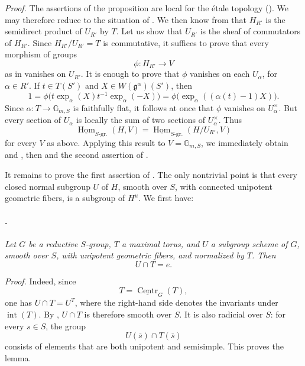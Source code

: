 \textit{Proof.}
The assertions of the proposition are local for the étale topology
\textup{()}. We may therefore reduce to the situation
of . We then know from  that \(H_{R'}\) is the semidirect
product of \(U_{R'}\) by \(T\). Let us show that \(U_{R'}\) is the
sheaf of commutators of \(H_{R'}\). Since
\(H_{R'}/U_{R'}=T\) is commutative, it suffices to prove that every
morphism of groups
\[
  \phi:H_{R'}\longrightarrow V
\]
as in \textup{} vanishes on \(U_{R'}\). It is enough to prove
that \(\phi\) vanishes on each \(U_\alpha\), for \(\alpha\in R'\).
If \(t\in T(S')\) and \(X\in W(\mathfrak g^\alpha)(S')\), then
\[
  1
  =
  \phi\bigl(t\exp_\alpha(X)t^{-1}\exp_\alpha(-X)\bigr)
  =
  \phi\bigl(\exp_\alpha((\alpha(t)-1)X)\bigr).
\]
Since \(\alpha:T\longrightarrow\mathbb G_{m,S}\) is faithfully
flat, it follows at once that \(\phi\) vanishes on
\(U_\alpha^\times\). But every section of \(U_\alpha\) is locally
the sum of two sections of \(U_\alpha^\times\). Thus
\[
  \underline{\operatorname{Hom}}_{S\text{-gr.}}(H,V)
  =
  \underline{\operatorname{Hom}}_{S\text{-gr.}}
    (H/U_{R'},V)
\]
for every \(V\) as above. Applying this result to
\(V=\mathbb G_{m,S}\), we immediately obtain \textup{} and
\textup{}, then \textup{} and the second assertion of
\textup{}.

It remains to prove the first assertion of \textup{}. The only
nontrivial point is that every closed normal subgroup \(U\) of
\(H\), smooth over \(S\), with connected unipotent geometric
fibers, is a subgroup of \(H^u\). We first have:

\paragraph{.}
\textit{Let \(G\) be a reductive \(S\)-group, \(T\) a maximal
torus, and \(U\) a subgroup scheme of \(G\), smooth over \(S\),
with unipotent geometric fibers, and normalized by \(T\). Then}
\[
  U\cap T=e.
\]

\textit{Proof.}
Indeed, since
\[
  T=\underline{\operatorname{Centr}}_G(T),
\]
one has \(U\cap T=U^T\), where the right-hand side denotes the
invariants under \(\operatorname{int}(T)\). By ,
\(U\cap T\) is therefore smooth over \(S\). It is also radicial
over \(S\): for every \(s\in S\), the group
\[
  U(\overline s)\cap T(\overline s)
\]
consists of elements that are both unipotent and semisimple. This
proves the lemma.

